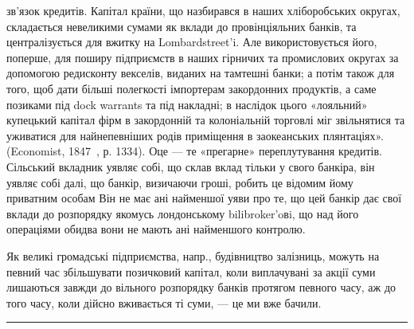 зв’язок кредитів. Капітал країни, що назбирався в наших хліборобських
округах, складається невеликими сумами як вклади до провінціяльних банків,
та централізується для вжитку на Lombardstreet’i. Але використовується його,
поперше, для поширу підприємств в наших гірничих та промислових округах за
допомогою редисконту векселів, виданих на тамтешні банки; а потім також для того,
щоб дати більші полегкості імпортерам закордонних продуктів, а саме позиками
під dock warrants та під накладні; в наслідок цього «лояльний» купецький
капітал фірм в закордонній та колоніальній торговлі міг звільнятися та уживатися
для найнепевніших родів приміщення в заокеанських плянтаціях». (Economist,
1847~, р. 1334). Оце — те «прегарне» переплутування кредитів. Сільський
вкладник уявляє собі, що склав вклад тільки у свого банкіра, він уявляє собі
далі, що банкір, визичаючи гроші, робить це відомим йому приватним особам
Він не має ані найменшої уяви про те, що цей банкір дає свої вклади до розпорядку
якомусь лондонському bilibroker’oвi, що над його операціями обидва
вони не мають ані найменшого контролю.

Як великі громадські підприємства, напр., будівництво залізниць, можуть
на певний час збільшувати позичковий капітал, коли виплачувані за акції
суми лишаються завжди до вільного розпорядку банків протягом певного часу,
аж до того часу, коли дійсно вживається ті суми, — це ми вже бачили.
\pfbreak

